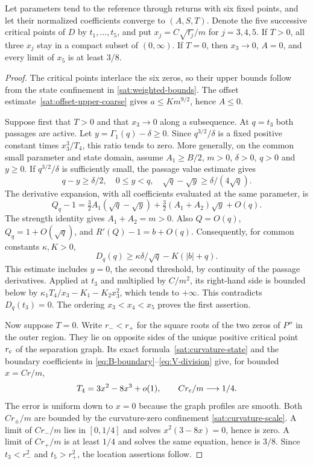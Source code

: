 \begin{lemma}\label{lem:k4-event}
Let parameters tend to the reference through returns with six fixed points,
and let their normalized coefficients converge to $(A,S,T)$. Denote the five successive critical points of $D$
by $t_1,\ldots,t_5$, and put $x_j=C\sqrt{t_j}/m$ for $j=3,4,5$.
If $T>0$, all three $x_j$ stay in a compact subset of $(0,\infty)$.
If $T=0$, then $x_3\to0$, $A=0$, and every limit of $x_5$ is at least
$3/8$.
\end{lemma}
\begin{proof}
The critical points interlace the six zeros, so their upper bounds follow
from the state confinement in \eqref{sat:weighted-bounds}. The offset
estimate~\eqref{sat:offset-upper-coarse} gives
$a\le K m^{9/2}$, hence $A\le0$.

Suppose first that $T>0$ and that $x_3\to0$ along a subsequence.
At $q=t_3$ both passages are active. Let $y=\Gamma_1(q)-\delta\ge0$.
Since $q^{3/2}/\delta$ is a fixed positive constant times $x_3^3/T_4$,
this ratio tends to zero. More generally, on the common small parameter
and state domain, assume $A_1\ge B/2$, $m>0$, $\delta>0$, $q>0$ and
$y\ge0$. If $q^{3/2}/\delta$ is sufficiently small, the passage value
estimate gives
\[
 q-y\ge\delta/2,\quad 0\le y<q,\quad
 \sqrt q-\sqrt y\ge\delta/(4\sqrt q).
\]
The derivative expansion, with all coefficients evaluated at the same
parameter, is
\[
 Q_q-1=\tfrac32A_1(\sqrt q-\sqrt y)
       +\tfrac32(A_1+A_2)\sqrt y+O(q).
\]
The strength identity gives $A_1+A_2=m>0$. Also $Q=O(q)$,
$Q_q=1+O(\sqrt q)$, and $R'(Q)-1=b+O(q)$. Consequently, for common
constants $\kappa,K>0$,
\begin{equation}\label{sat:threshold-slope-exclusion}
 D_q(q)\ge \kappa\delta/\sqrt q-K(|b|+q).
\end{equation}
This estimate includes $y=0$, the second threshold, by continuity of the
passage derivatives. Applied at $t_3$ and multiplied by $C/m^2$, its
right-hand side is bounded below by
$\kappa_1T_4/x_3-K_1-K_2x_3^2$, which tends to $+\infty$. This contradicts
$D_q(t_3)=0$. The ordering $x_3<x_4<x_5$ proves the first assertion.

Now suppose $T=0$. Write $r_-<r_+$ for the square roots of the two zeros
of $P''$ in the outer region. They lie on opposite sides of the unique
positive critical point $r_{\rm c}$ of the separation graph. Its exact
formula~\eqref{sat:curvature-state} and the boundary coefficients in
\eqref{eq:B-boundary}--\eqref{eq:V-division} give, for bounded $x=Cr/m$,
\[
 T_4=3x^2-8x^3+o(1),\qquad Cr_{\rm c}/m\longrightarrow1/4.
\]
The error is uniform down to $x=0$ because the graph profiles are smooth.
Both $Cr_\pm/m$ are bounded by the curvature-zero confinement
\eqref{sat:curvature-scale}. A limit
of $Cr_-/m$ lies in $[0,1/4]$ and solves $x^2(3-8x)=0$, hence is zero.
A limit of $Cr_+/m$ is at least $1/4$ and solves the same equation, hence
is $3/8$. Since $t_3<r_-^2$ and $t_5>r_+^2$, the location assertions follow.


\end{proof}

